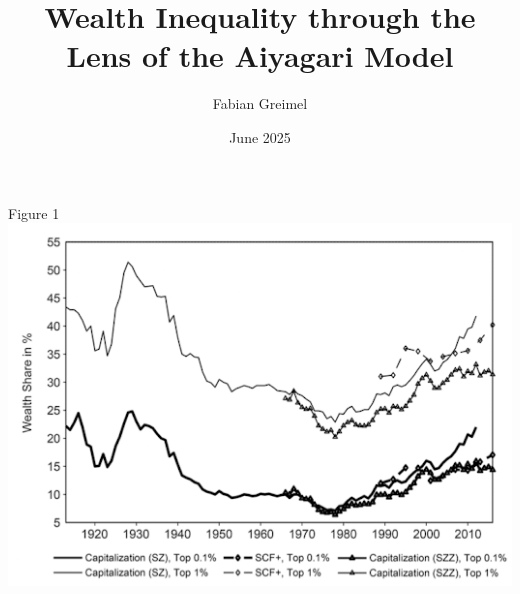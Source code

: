 \documentclass[aspectratio=169,mathserif]{beamer}
\title{Wealth Inequality through the Lens of the Aiyagari Model}
\author{Fabian Greimel}
\date{June 2025}
\begin{document}
\frame{\titlepage}



\begin{frame}{Figure 1}
    \centering
    \includegraphics[scale = 0.5]{HKS_Fig_1.png}
\end{frame}
\end{document}
